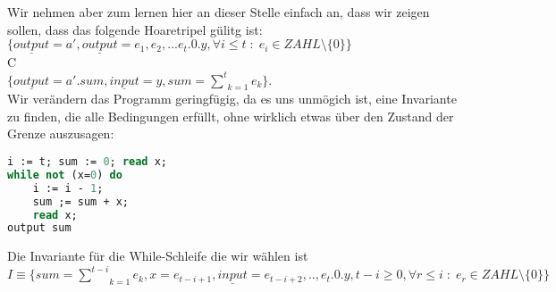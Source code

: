 \documentclass[11pt,a4paper,ngerman]{article}
\begin{document}
Wir nehmen aber zum lernen hier an dieser Stelle einfach an, dass wir zeigen sollen, dass das folgende Hoaretripel gülitg ist:
$
\{ \underline{output} = a',  \underline{output} = e_1,e_2,...e_t.0.y, \forall i \leq t \; : \; e_i \in ZAHL \setminus \{0\}\}
$\\
C\\
$
\{ \underline{output} = a'.sum, \underline{input} = y , sum = \underset{k=1}{\overset{t}{\sum}} e_k \}.
$\\
Wir verändern das Programm geringfügig, da es uns unmögich ist, eine Invariante zu finden, die alle Bedingungen erfüllt, ohne wirklich etwas über den Zustand der Grenze auszusagen:\\
\begin{lstlisting}[language=Pascal]
i := t; sum := 0; read x;
while not (x=0) do
    i := i - 1;
    sum ;= sum + x;
    read x;
output sum
\end{lstlisting}

Die Invariante für die While-Schleife die wir wählen ist
$I \equiv \{ sum =  \underset{k=1}{\overset{t-i}{\sum}} e_k,  x = e_{t-i+1} , \underline{input} = e_{t-i+2},..,e_{t}.0.y , t - i \geq 0
, \forall r \leq i \; : \; e_r \in ZAHL \setminus \{ 0 \}\}$
\end{document}
